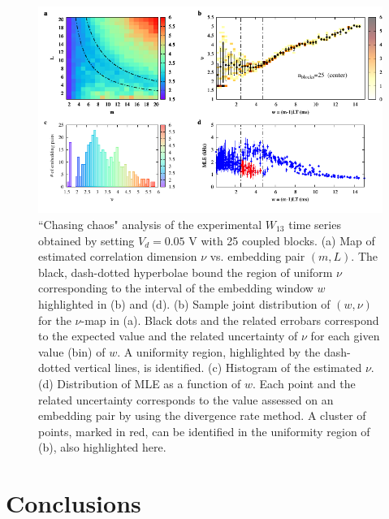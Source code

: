 \begin{figure}[H]
    \centering
    \includegraphics[width=\linewidth]{../blocks/25_blocks/middle/2e5_points/plots/chaos_low.pdf}
    \caption{``Chasing chaos" analysis of the experimental $W_{13}$ time series obtained by setting $V_d=0.05$ V with 25 coupled blocks.
    (a) Map of estimated correlation dimension $\nu$ vs. embedding pair $(m, L)$.
    The black, dash-dotted hyperbolae bound the region of uniform $\nu$ corresponding to the interval of the
    embedding window $w$ highlighted in (b) and (d).
    (b) Sample joint distribution of $(w,\nu)$ for the $\nu$-map in (a).
    Black dots and the related errobars correspond to the expected value and the related uncertainty of $\nu$
    for each given value (bin) of $w$. A uniformity region, highlighted by the dash-dotted vertical lines,
    is identified. (c) Histogram of the estimated $\nu$. (d) Distribution of MLE as a function of $w$. Each point and the related
    uncertainty corresponds to the value assessed on an embedding pair by using the divergence rate method.
    A cluster of points, marked in red, can be identified in the uniformity region of (b), also highlighted here.}
    \label{fig:25 blocks chaos middle}
\end{figure}

\clearpage

\section{Conclusions}

